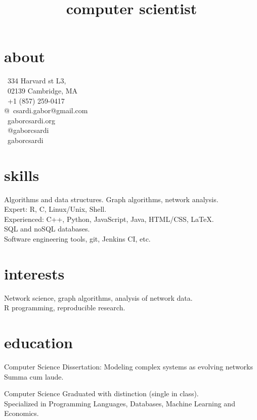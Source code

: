\documentclass[11pt]{moderncv}
\title{computer scientist}
\begin{document}
\RaggedRight

\makecvtitle

\begin{aside}
\section{about}
\faEnvelope\ 334 Harvard st L3,\\
\textcolor{color4}{\faEnvelope}\ 02139 Cambridge, MA\\
\faPhone\ +1 (857) 259-0417\\
@\ \nolinebreak{}csardi.gabor@gmail.com\\
\faGlobe\ gaborcsardi.org\\
\faTwitter\ @gaborcsardi\\
\faGithub\ gaborcsardi
\section{skills}
Algorithms and data structures.
Graph algorithms, network analysis.\\[6pt]
Expert: R, C, Linux/Unix, Shell.\\
Experienced: C++, Python, JavaScript,
  Java, HTML/CSS, \LaTeX.\\[6pt]
SQL and noSQL databases.\\[6pt]
Software engineering tools,
git, Jenkins CI, etc.
\end{aside}

\section{interests}

Network science, graph algorithms, analysis of network data.\\
R programming, reproducible research.

\section{education}

%
{Computer Science}%
{Dissertation: Modeling complex systems as evolving networks\\
Summa cum laude.}

%
{Computer Science}%
{Graduated with distinction (single in class).\\
Specialized in Programming Languages, Databases, Machine Learning and
Economics.}
\end{document}
